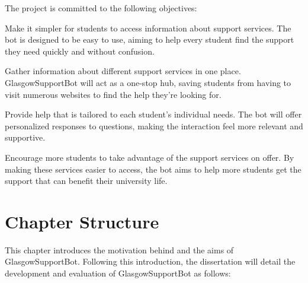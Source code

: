\documentclass{l4proj}
\begin{document}
The project is committed to the following objectives:

Make it simpler for students to access information about support services. The bot is designed to be easy to use, aiming to help every student find the support they need quickly and without confusion.

Gather information about different support services in one place. GlasgowSupportBot will act as a one-stop hub, saving students from having to visit numerous websites to find the help they're looking for.

Provide help that is tailored to each student's individual needs. The bot will offer personalized responses to questions, making the interaction feel more relevant and supportive.

Encourage more students to take advantage of the support services on offer. By making these services easier to access, the bot aims to help more students get the support that can benefit their university life.

\section{Chapter Structure}

This chapter introduces the motivation behind and the aims of GlasgowSupportBot. Following this introduction, the dissertation will detail the development and evaluation of GlasgowSupportBot as follows:
\end{document}
